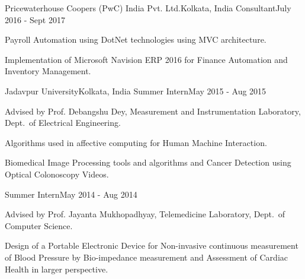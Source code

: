 \documentclass[letterpaper,10pt]{article}
\begin{document}
\resumeSubheading
{Pricewaterhouse Coopers (PwC) India Pvt. Ltd.}{Kolkata, India}
{Consultant}{July 2016 - Sept 2017}
\resumeItemListStart
\item {Payroll Automation using DotNet technologies using MVC architecture.}
\item {Implementation of Microsoft Navision ERP 2016 for Finance Automation and Inventory Management.}
\resumeItemListEnd

\resumeSubheading
{Jadavpur University}{Kolkata, India}
{Summer Intern}{May 2015 - Aug 2015}
\resumeItemListStart
\item {Advised by Prof. Debangshu Dey, Measurement and Instrumentation Laboratory, Dept.\ of Electrical Engineering.}
\item {Algorithms used in affective computing for Human Machine Interaction.}
\item {Biomedical Image Processing tools and algorithms and Cancer Detection using Optical Colonoscopy Videos.}
\resumeItemListEnd

{Summer Intern}{May 2014 - Aug 2014}
\resumeItemListStart
\item {Advised by Prof. Jayanta Mukhopadhyay, Telemedicine Laboratory, Dept.\ of Computer Science.}
\item {Design of a Portable Electronic Device for Non-invasive continuous measurement of Blood Pressure by Bio-impedance measurement and Assessment of Cardiac Health in larger perspective.}
\resumeItemListEnd
\resumeSubHeadingListEnd

\end{document}
